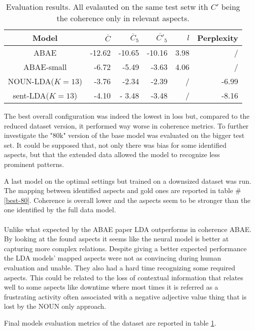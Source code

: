 \begin{center}
    \begin{table}
        \begin{tabular}{c r r r r r}
            \hline
            Model            & $\overline{C}$ & $\overline{C}_5$ & $\overline{C'}_5$ & $l$  & Perplexity\\ [0.5ex]
            \hline
            ABAE             & -12.62         & -10.65           & -10.16            & 3.98 & /          \\
            \hline
            ABAE-small       & -6.72          & -5.49            & -3.63             & 4.06 & /          \\
            \hline
            NOUN-LDA($K=13$) & -3.76          & -2.34            & -2.39             & /    & -6.99      \\
            \hline
            sent-LDA($K=13$) & -4.10          & - 3.48           & -3.48             & /    & -8.16      \\
            \hline
        \end{tabular}
        \caption{Evaluation results. All evalauted on the same test setw ith $C'$ being the coherence only in relevant aspects.
        }
        \label{performance-review}

    \end{table}

\end{center}

The best overall configuration was indeed the lowest in loss but, compared to the reduced
dataset version, it performed way worse in coherence metrics.
To further investigate the "80k" version of the base model was evaluated on the bigger test set.
It could be supposed that, not only there was bias for some identified aspects, but that the extended
data allowed the model to recognize less prominent patterns.

A last model on the optimal settings but trained on a downsized dataset was run.
The mapping between identified aspects and gold ones are reported in table \#\ref{best-80}.
Coherence is overall lower and the aspects seem to be stronger than the one identified by the full data model.

\paragraph{}
Unlike what expected by the ABAE paper LDA outperforms in coherence ABAE.
By looking at the found aspects it seems like the neural model is better at capturing more complex relations.
Despite giving a better expected performance the LDA models' mapped aspects were not
as convincing during human evaluation and unable.
They also had a hard time recognizing some required aspects.
This could be related to the loss of contextual information that relates well to
some aspects like downtime where most times it is referred as a frustrating activity
often associated with a negative adjective value thing that is lost by the NOUN only approach.

Final models evaluation metrics of the dataset are reported in table \ref{performance-review}.
